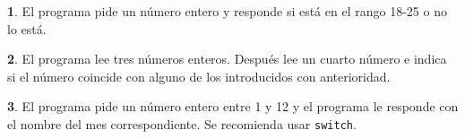\documentclass[a4paper, 12pt]{article}
\theoremstyle{definition}
\newtheorem{ejer}{}[section]
\begin{document}
\begin{ejer}
El programa pide un número entero y responde si está en el rango 18-25 o no lo está.
\end{ejer}

\begin{ejer}
El programa lee tres números enteros. Después lee un cuarto número e indica si el número coincide con alguno de los introducidos con anterioridad.
\end{ejer}

\begin{ejer}
El programa pide un número entero entre 1 y 12 y el programa le responde con el nombre del mes correspondiente.  Se recomienda usar \verb|switch|.
\end{ejer}
\end{document}
